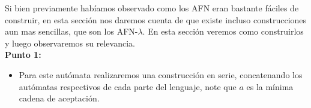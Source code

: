 Si bien previamente habíamos observado como los AFN eran bastante fáciles de construir, en esta sección nos daremos cuenta de que existe incluso construcciones aun mas sencillas, que son los AFN-$\lambda$. En esta sección veremos como construirlos y luego observaremos su relevancia.\\

\textbf{Punto 1:}

\begin{itemize}[label={✎}]
    \item Para este autómata realizaremos una construcción en serie, concatenando los autómatas respectivos de cada parte del lenguaje, note que $a$ es la mínima cadena de aceptación.
    \begin{basedtikz}
    \end{basedtikz}


\end{itemize}
